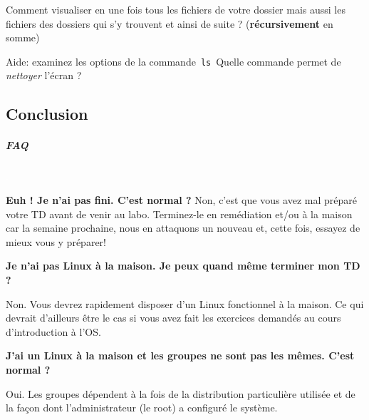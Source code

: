 \documentclass[a4paper,11pt]{article}
\begin{document}
\begin{Exercice}{}
Comment visualiser en une fois tous les fichiers de votre dossier 
mais aussi les fichiers des dossiers qui s'y trouvent et ainsi de suite ? 
(\textbf{r\'ecursivement} en somme)\par

Aide: examinez les options de la commande \,\verb|ls|\,  
Quelle commande permet de \textit{nettoyer} l'\'ecran ?  

\par
	
\end{Exercice}

        \subsection{Conclusion}

\subparagraph{FAQ} 

\textcolor{white}{.} %

\par
\textbf{Euh ! Je n'ai pas fini. C'est normal ?}
Non, c'est que vous avez mal pr\'epar\'e votre TD avant de venir au labo. 
Terminez-le en rem\'ediation et/ou \`a la maison car la semaine prochaine, 
nous en attaquons un nouveau et, cette fois, essayez de mieux vous y pr\'eparer!  

\par
\textbf{Je n'ai pas Linux \`a la maison. Je peux quand m\^eme terminer mon TD ?}
\par

Non. Vous devrez rapidement disposer d'un Linux fonctionnel \`a la maison.
Ce qui devrait d'ailleurs \^etre le cas si vous avez fait
les exercices demand\'es au cours d'introduction \`a l'OS.

\par
\textbf{J'ai un Linux \`a la maison et les groupes ne sont pas les m\^emes. C'est normal ?}
\par

Oui. 
Les groupes d\'ependent \`a la fois de la distribution particuli\`ere utilis\'ee
et de la fa\c con dont l'administrateur (le root) a configur\'e le syst\`eme.   

\par
\end{document}
